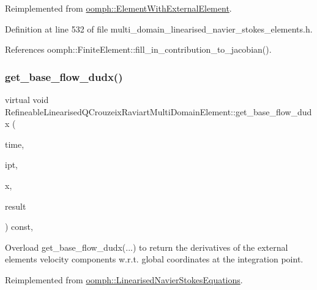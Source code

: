 Reimplemented from \hyperlink{classoomph_1_1ElementWithExternalElement_ae5fb09552a8271e891438f8d058ca1b8}{oomph\+::\+Element\+With\+External\+Element}.



Definition at line 532 of file multi\+\_\+domain\+\_\+linearised\+\_\+navier\+\_\+stokes\+\_\+elements.\+h.



References oomph\+::\+Finite\+Element\+::fill\+\_\+in\+\_\+contribution\+\_\+to\+\_\+jacobian().

\mbox{\label{classRefineableLinearisedQCrouzeixRaviartMultiDomainElement_ae30ee573668da667c4ee9bdadd47b905}} 
\subsubsection{\texorpdfstring{get\+\_\+base\+\_\+flow\+\_\+dudx()}{get\_base\_flow\_dudx()}}
{\footnotesize\ttfamily virtual void Refineable\+Linearised\+Q\+Crouzeix\+Raviart\+Multi\+Domain\+Element\+::get\+\_\+base\+\_\+flow\+\_\+dudx (\begin{DoxyParamCaption}\item[{const double \&}]{time,  }\item[{const unsigned \&}]{ipt,  }\item[{const \hyperlink{classoomph_1_1Vector}{Vector}$<$ double $>$ \&}]{x,  }\item[{\hyperlink{classoomph_1_1DenseMatrix}{Dense\+Matrix}$<$ double $>$ \&}]{result }\end{DoxyParamCaption}) const\hspace{0.3cm}{\ttfamily [inline]}, {\ttfamily [virtual]}}



Overload get\+\_\+base\+\_\+flow\+\_\+dudx(...) to return the derivatives of the external element\textquotesingle{}s velocity components w.\+r.\+t. global coordinates at the integration point. 



Reimplemented from \hyperlink{classoomph_1_1LinearisedNavierStokesEquations_ab4b45c111571d3904985dcefcae8ef67}{oomph\+::\+Linearised\+Navier\+Stokes\+Equations}.



